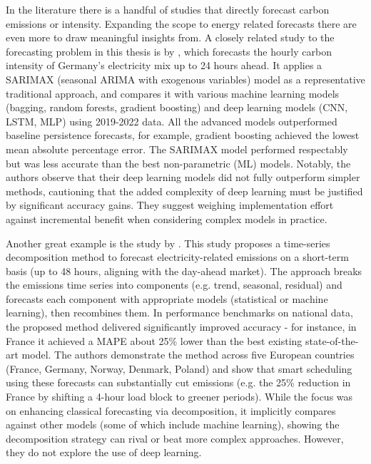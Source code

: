 In the literature there is a handful of studies that directly forecast carbon emissions or intensity. Expanding the scope to energy related forecasts there are even more to draw meaningful insights from. A closely related study to the forecasting problem in this thesis is  by \textcite{ostermann2024}, which forecasts the hourly carbon intensity of Germany's electricity mix up to 24 hours ahead. It applies a SARIMAX (seasonal ARIMA with exogenous variables) model as a representative traditional approach, and compares it with various machine learning models (bagging, random forests, gradient boosting) and deep learning models (CNN, LSTM, MLP) using 2019-2022 data. All the advanced models outperformed baseline persistence forecasts, for example, gradient boosting achieved the lowest mean absolute percentage error. The SARIMAX model performed respectably but was less accurate than the best non-parametric (ML) models. Notably, the authors observe that their deep learning models did not fully outperform simpler methods, cautioning that the added complexity of deep learning must be justified by significant accuracy gains. They suggest weighing implementation effort against incremental benefit when considering complex models in practice.

Another great example is the study  by \textcite{bokde2021}. This study proposes a time-series decomposition method to forecast electricity-related \cotwo{} emissions on a short-term basis (up to 48 hours, aligning with the day-ahead market). The approach breaks the emissions time series into components (e.g. trend, seasonal, residual) and forecasts each component with appropriate models (statistical or machine learning), then recombines them. In performance benchmarks on national data, the proposed method delivered significantly improved accuracy - for instance, in France it achieved a MAPE about 25\% lower than the best existing state-of-the-art model. The authors demonstrate the method across five European countries (France, Germany, Norway, Denmark, Poland) and show that smart scheduling using these forecasts can substantially cut emissions (e.g. the 25\% reduction in France by shifting a 4-hour load block to greener periods). While the focus was on enhancing classical forecasting via decomposition, it implicitly compares against other models (some of which include machine learning), showing the decomposition strategy can rival or beat more complex approaches. However, they do not explore the use of deep learning.

